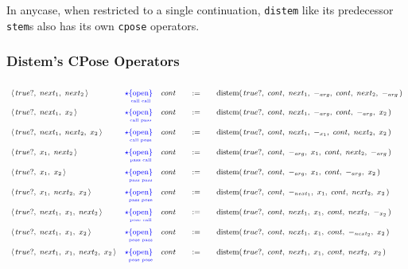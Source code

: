 \documentclass[twoside]{article}
\newcommand{\qdefeq}{\ensuremath{\quad :=\quad}}
\newcommand{\distem}{\mbox{distem}}
\newcommand{\underpose}[2]{\ensuremath{\underset{\mbox{\tiny #2}}{\{\mbox{#1}\}}}}
\newcommand{\varstempose}[4]{\ensuremath{\textcolor{#1}{#2\underpose{#3}{#4}}}}
\newcommand{\dpose}[2][blue]{\varstempose{#1}{\star}{open}{#2}}
\begin{document}
In anycase, when restricted to a single continuation, \texttt{distem}
like its predecessor \texttt{stem}s also has its own \texttt{cpose} operators.

\subsubsection*{Distem's CPose Operators}

$$ \def\arraystretch{1.75}
\small
\begin{array}{lllcl}
\langle\,true?,\ next_1,\ next_2\,\rangle		& \dpose{call call}								&
cont & \qdefeq						& \distem(\,true?,\ cont,\ next_1,\ -_{arg},\ cont,\ next_2,\ -_{arg}\,)	\\

\langle\,true?,\ next_1,\ x_2\,\rangle			& \dpose{call pass}								&
cont & \qdefeq						& \distem(\,true?,\ cont,\ next_1,\ -_{arg},\ cont,\ -_{arg},\ x_2\,)		\\

\langle\,true?,\ next_1,\ next_2,\ x_2\,\rangle		& \dpose{call pose}								&
cont & \qdefeq						& \distem(\,true?,\ cont,\ next_1,\ -_{x_1},\ cont,\ next_2,\ x_2\,)		\\

\langle\,true?,\ x_1,\ next_2\,\rangle			& \dpose{pass call}								&
cont & \qdefeq						& \distem(\,true?,\ cont,\ -_{arg},\ x_1,\ cont,\ next_2,\ -_{arg}\,)		\\

\langle\,true?,\ x_1,\ x_2\,\rangle			& \dpose{pass pass}								&
cont & \qdefeq						& \distem(\,true?,\ cont,\ -_{arg},\ x_1,\ cont,\ -_{arg},\ x_2\,)		\\

\langle\,true?,\ x_1,\ next_2,\ x_2\,\rangle		& \dpose{pass pose}								&
cont & \qdefeq						& \distem(\,true?,\ cont,\ -_{next_1},\ x_1,\ cont,\ next_2,\ x_2\,)		\\

\langle\,true?,\ next_1,\ x_1,\ next_2\,\rangle		& \dpose{pose call}								&
cont & \qdefeq						& \distem(\,true?,\ cont,\ next_1,\ x_1,\ cont,\ next_2,\ -_{x_2}\,)		\\

\langle\,true?,\ next_1,\ x_1,\ x_2\,\rangle		& \dpose{pose pass}								&
cont & \qdefeq						& \distem(\,true?,\ cont,\ next_1,\ x_1,\ cont,\ -_{next_2},\ x_2\,)		\\

\langle\,true?,\ next_1,\ x_1,\ next_2,\ x_2\,\rangle	& \dpose{pose pose}								&
cont & \qdefeq						& \distem(\,true?,\ cont,\ next_1,\ x_1,\ cont,\ next_2,\ x_2\,)		\\
\end{array} $$
\end{document}
